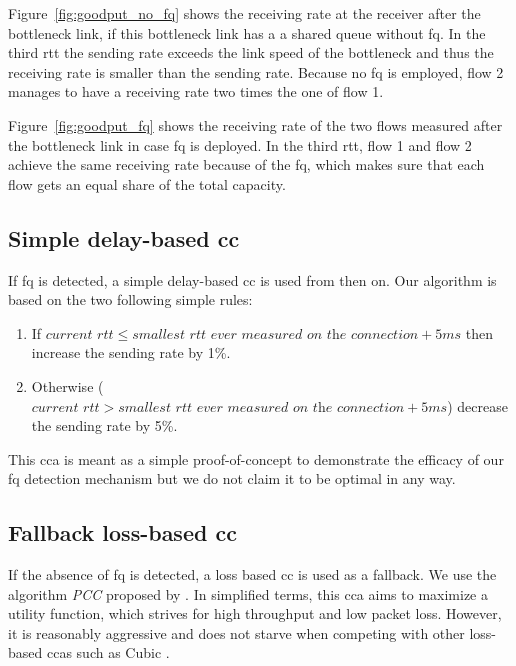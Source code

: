 \documentclass[runningheads]{llncs}
\begin{document}
Figure~\ref{fig:goodput_no_fq} shows the receiving rate at the receiver after the bottleneck link, if this bottleneck link has a a shared queue without \gls{fq}. In the third \gls{rtt} the sending rate exceeds the link speed of the bottleneck and thus the receiving rate is smaller than the sending rate. Because no \gls{fq} is employed, flow 2 manages to have a receiving rate two times the one of flow 1. 

Figure~\ref{fig:goodput_fq} shows the receiving rate of the two flows measured after the bottleneck link in case \gls{fq} is deployed. In the third \gls{rtt}, flow 1 and flow 2 achieve the same receiving rate because of the \gls{fq}, which makes sure that each flow gets an equal share of the total capacity. 

\subsection{Simple delay-based \gls{cc}}

If \gls{fq} is detected, a simple delay-based \gls{cc} is used from then on. Our algorithm is based on the two following simple rules:
\begin{enumerate}
\item If $\textit{current rtt} \leq \textit{smallest rtt ever measured on the connection} + 5\textit{ms}$ then increase the sending rate by 1\%.
\item Otherwise ($\textit{current rtt} > \textit{smallest rtt ever measured on the connection} + 5\textit{ms}$) decrease the sending rate by 5\%.
\end{enumerate}

This \gls{cca} is meant as a simple proof-of-concept to demonstrate the efficacy of our \gls{fq} detection mechanism but we do not claim it to be optimal in any way. 

\subsection{Fallback loss-based \gls{cc}}

If the absence of \gls{fq} is detected, a loss based \gls{cc} is used as a fallback. We use the algorithm \textit{PCC} proposed by \cite{dong_pcc_2015}. In simplified terms, this \gls{cca} aims to maximize a utility function, which strives for high throughput and low packet loss. However, it is reasonably aggressive and does not starve when competing with other loss-based \glspl{cca} such as Cubic \cite{ha_cubic_2008}.
\end{document}
